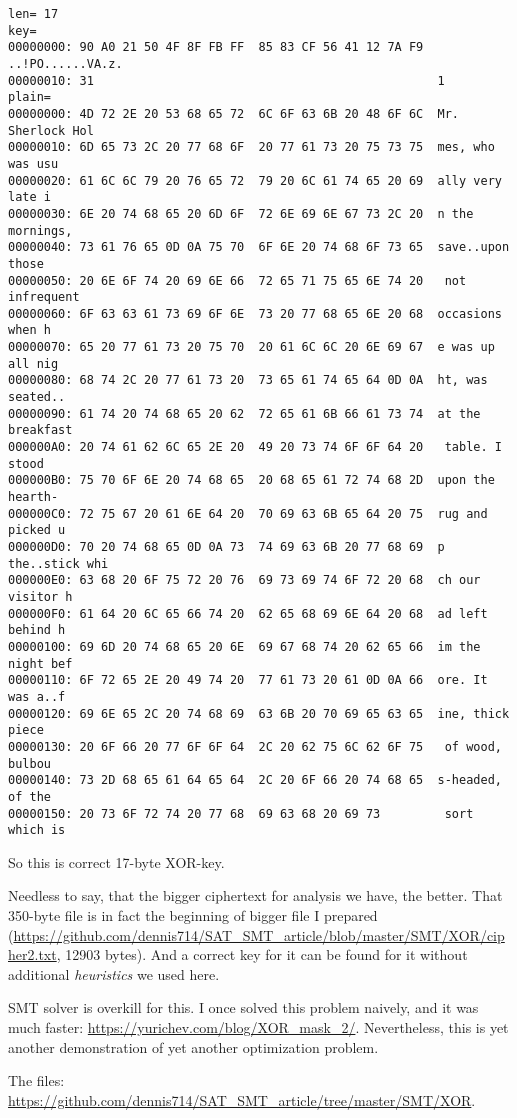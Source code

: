 \begin{lstlisting}
len= 17
key=
00000000: 90 A0 21 50 4F 8F FB FF  85 83 CF 56 41 12 7A F9  ..!PO......VA.z.
00000010: 31                                                1
plain=
00000000: 4D 72 2E 20 53 68 65 72  6C 6F 63 6B 20 48 6F 6C  Mr. Sherlock Hol
00000010: 6D 65 73 2C 20 77 68 6F  20 77 61 73 20 75 73 75  mes, who was usu
00000020: 61 6C 6C 79 20 76 65 72  79 20 6C 61 74 65 20 69  ally very late i
00000030: 6E 20 74 68 65 20 6D 6F  72 6E 69 6E 67 73 2C 20  n the mornings,
00000040: 73 61 76 65 0D 0A 75 70  6F 6E 20 74 68 6F 73 65  save..upon those
00000050: 20 6E 6F 74 20 69 6E 66  72 65 71 75 65 6E 74 20   not infrequent
00000060: 6F 63 63 61 73 69 6F 6E  73 20 77 68 65 6E 20 68  occasions when h
00000070: 65 20 77 61 73 20 75 70  20 61 6C 6C 20 6E 69 67  e was up all nig
00000080: 68 74 2C 20 77 61 73 20  73 65 61 74 65 64 0D 0A  ht, was seated..
00000090: 61 74 20 74 68 65 20 62  72 65 61 6B 66 61 73 74  at the breakfast
000000A0: 20 74 61 62 6C 65 2E 20  49 20 73 74 6F 6F 64 20   table. I stood
000000B0: 75 70 6F 6E 20 74 68 65  20 68 65 61 72 74 68 2D  upon the hearth-
000000C0: 72 75 67 20 61 6E 64 20  70 69 63 6B 65 64 20 75  rug and picked u
000000D0: 70 20 74 68 65 0D 0A 73  74 69 63 6B 20 77 68 69  p the..stick whi
000000E0: 63 68 20 6F 75 72 20 76  69 73 69 74 6F 72 20 68  ch our visitor h
000000F0: 61 64 20 6C 65 66 74 20  62 65 68 69 6E 64 20 68  ad left behind h
00000100: 69 6D 20 74 68 65 20 6E  69 67 68 74 20 62 65 66  im the night bef
00000110: 6F 72 65 2E 20 49 74 20  77 61 73 20 61 0D 0A 66  ore. It was a..f
00000120: 69 6E 65 2C 20 74 68 69  63 6B 20 70 69 65 63 65  ine, thick piece
00000130: 20 6F 66 20 77 6F 6F 64  2C 20 62 75 6C 62 6F 75   of wood, bulbou
00000140: 73 2D 68 65 61 64 65 64  2C 20 6F 66 20 74 68 65  s-headed, of the
00000150: 20 73 6F 72 74 20 77 68  69 63 68 20 69 73         sort which is
\end{lstlisting}

So this is correct 17-byte XOR-key.

Needless to say, that the bigger ciphertext for analysis we have, the better.
That 350-byte file is in fact the beginning of bigger file I prepared
(\url{https://github.com/dennis714/SAT_SMT_article/blob/master/SMT/XOR/cipher2.txt}, 12903 bytes).
And a correct key for it can be found for it without additional \textit{heuristics} we used here.

SMT solver is overkill for this. I once solved this problem naively, and it was much faster:
\url{https://yurichev.com/blog/XOR_mask_2/}.
Nevertheless, this is yet another demonstration of yet another optimization problem.

The files: \url{https://github.com/dennis714/SAT_SMT_article/tree/master/SMT/XOR}.

